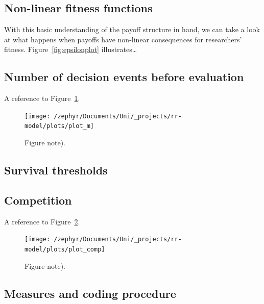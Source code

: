 \documentclass[british,,man,floatsintext]{apa6}
\begin{document}
\hypertarget{non-linear-fitness-functions-1}{%
\subsection{Non-linear fitness functions}\label{non-linear-fitness-functions-1}}

With this basic understanding of the payoff structure in hand, we can take a look at what happens when payoffs have non-linear consequences for researchers' fitness.
Figure~\ref{fig:epsilonplot} illustrates\ldots{}

\hypertarget{number-of-decision-events-before-evaluation-1}{%
\subsection{Number of decision events before evaluation}\label{number-of-decision-events-before-evaluation-1}}

A reference to Figure~\ref{fig:mplot}.



\begin{figure}
\texttt{[image: /zephyr/Documents/Uni/\_projects/rr-model/plots/plot\_m]} \caption{Figure note).}\label{fig:mplot}
\end{figure}

\hypertarget{survival-thresholds}{%
\subsection{Survival thresholds}\label{survival-thresholds}}

\hypertarget{competition}{%
\subsection{Competition}\label{competition}}

A reference to Figure~\ref{fig:competitionplot}.



\begin{figure}
\texttt{[image: /zephyr/Documents/Uni/\_projects/rr-model/plots/plot\_comp]} \caption{Figure note).}\label{fig:competitionplot}
\end{figure}

\hypertarget{measures-and-coding-procedure}{%
\subsection{Measures and coding procedure}\label{measures-and-coding-procedure}}
\end{document}
